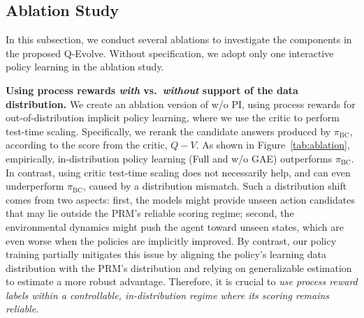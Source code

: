 \documentclass{article}
\newcommand{\cmark}{\textcolor{green!60!black}{\ding{51}}} %
\newcommand{\xmark}{\textcolor{red!70!black}{\ding{55}}}   %
\theoremstyle{plain}
\theoremstyle{definition}
\theoremstyle{remark}
\begin{document}





\subsection{Ablation Study}

In this subsection, we conduct several ablations to investigate the components in the proposed Q-Evolve. Without specification, we adopt only one interactive policy learning in the ablation study.

\textbf{Using process rewards \emph{with} vs.\ \emph{without} support of the data distribution.} We create an ablation version of w/o PI, using process rewards for out-of-distribution implicit policy learning, where we use the critic to perform test-time scaling. Specifically, we rerank the candidate answers produced by $\pi_{\text{BC}}$, according to the score from the critic, $Q- V$. As shown in Figure~\ref{tab:ablation}, empirically, in-distribution policy learning (Full and w/o GAE)  outperforms  $\pi_{\text{BC}}$. In contrast, using critic test-time scaling does not necessarily help, and can even underperform $\pi_{\text{BC}}$, caused by a distribution mismatch. Such a distribution shift comes from two aspects: first, the models might provide unseen action candidates that may lie outside the PRM’s reliable scoring regime; second, the environmental dynamics might push the agent toward unseen states, which are even worse when the policies are implicitly improved. By contrast, our policy training partially mitigates this issue by aligning the policy’s learning data distribution with the PRM’s distribution and relying on generalizable estimation to estimate a more robust advantage.
Therefore, it is crucial to \emph{use process reward labels within a controllable, in-distribution regime where its scoring remains reliable}.
\end{document}
